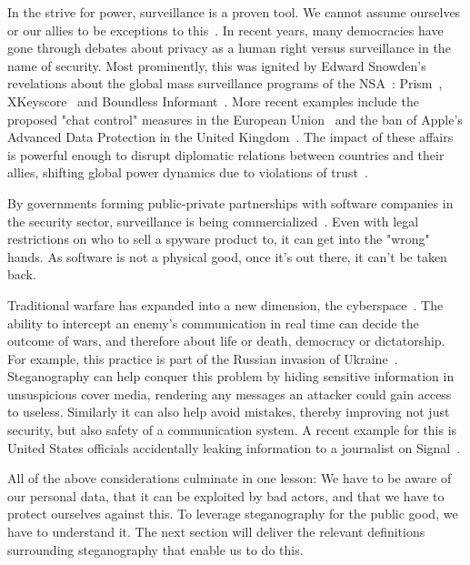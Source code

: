 In the strive for power, surveillance is a proven tool. We cannot assume ourselves or our allies to be exceptions to this~\cite{macaskillGCHQTapsFibreoptic2013}. In recent years, many democracies have gone through debates about privacy as a human right versus surveillance in the name of security. Most prominently, this was ignited by Edward Snowden's revelations about the global mass surveillance programs of the \gls{NSA}~\cite{greenwaldEdwardSnowdenWhistleblower2013}: Prism~\cite{greenwaldNSAPrismProgram2013}, XKeyscore~\cite{greenwaldXKeyscoreNSATool2013} and Boundless Informant~\cite{greenwaldBoundlessInformantNSAs2013}. More recent examples include the proposed "chat control" measures in the European Union~\cite{danielChatControlEnd2024} and the ban of Apple's Advanced Data Protection in the United Kingdom~\cite{kleinmanUKGovernmentDemands2025,kleinmanApplePullsData2025}. The impact of these affairs is powerful enough to disrupt diplomatic relations between countries and their allies, shifting global power dynamics due to violations of trust~\cite{traynorMerkelComparedNSA2013}.

By governments forming public-private partnerships with software companies in the security sector, surveillance is being commercialized~\cite{bbcPegasusSpywareSold2021,kasterPrivatizedEspionageNSO2023}. Even with legal restrictions on who to sell a spyware product to, it can get into the "wrong" hands. As software is not a physical good, once it's out there, it can't be taken back.

Traditional warfare has expanded into a new dimension, the cyberspace~\cite{serpanosCyberwarfareUkraine2022}. The ability to intercept an enemy's communication in real time can decide the outcome of wars, and therefore about life or death, democracy or dictatorship. For example, this practice is part of the Russian invasion of Ukraine~\cite{sufiSocialMediaAnalytics2023}. Steganography can help conquer this problem by hiding sensitive information in unsuspicious cover media, rendering any messages an attacker could gain access to useless. Similarly it can also help avoid mistakes, thereby improving not just security, but also safety of a communication system. A recent example for this is United States officials accidentally leaking information to a journalist on Signal~\cite{goldbergTrumpAdministrationAccidentally2025,goldbergHereAreAttack2025}.

All of the above considerations culminate in one lesson: We have to be aware of our personal data, that it can be exploited by bad actors, and that we have to protect ourselves against this. To leverage steganography for the public good, we have to understand it. The next section will deliver the relevant definitions surrounding steganography that enable us to do this.

